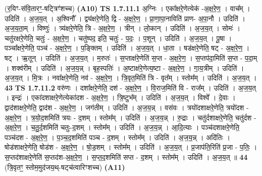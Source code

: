 \documentclass[17pt]{extarticle}
\begin{document}
                  \newline
                      (र॒यिꣳ-स॑वि॒तारꣳ॒॒-षट्त्रिꣳ॑शच्च)  \textbf{(A10)} \newline \newline
                                \textbf{ TS 1.7.11.1} \newline
                  अ॒ग्निः । एका᳚क्षरे॒णेत्येक॑ -अ॒क्ष॒रे॒ण॒ । वाच᳚म् । उदिति॑ । अ॒ज॒य॒त् । अ॒श्विनौ᳚ । द्व्य॑क्षरे॒णेति॒ द्वि - अ॒क्ष॒रे॒ण॒ । प्रा॒णा॒पा॒नाविति॑ प्राण- अ॒पा॒नौ । उदिति॑ । अ॒ज॒य॒ता॒म् । विष्णुः॑ । त्र्य॑क्षरे॒णेति॒ त्रि - अ॒क्ष॒रे॒ण॒ । त्रीन् । लो॒कान् । उदिति॑ । अ॒ज॒य॒त् । सोमः॑ । चतु॑रक्षरे॒णेति॒ चतुः॑ - अ॒क्ष॒रे॒ण॒ । चतु॑ष्पद॒ इति॒ चतुः॑ - प॒दः॒ । प॒शून् । उदिति॑ । अ॒ज॒य॒त् । पू॒षा । पञ्चा᳚क्षरे॒णेति॒ पञ्च॑ - अ॒क्ष॒रे॒ण॒ । प॒ङ्क्तिम् । उदिति॑ । अ॒ज॒य॒त् । धा॒ता । षड॑क्षरे॒णेति॒ षट् - अ॒क्ष॒रे॒ण॒ । षट् । ऋ॒तून् । उदिति॑ । अ॒ज॒य॒त् । म॒रुतः॑ । स॒प्ताक्ष॑रे॒णेति॑ स॒प्त - अ॒क्ष॒रे॒ण॒ । स॒प्तप॑दा॒मिति॑ स॒प्त - प॒दा॒म् । शक्व॑रीम् । उदिति॑ । अ॒ज॒य॒न्न् । बृह॒स्पतिः॑ । अ॒ष्टाक्ष॑रे॒णेत्य॒ष्टा - अ॒क्ष॒रे॒ण॒ । गा॒य॒त्रीम् । उदिति॑ । अ॒ज॒य॒त् । मि॒त्रः । नवा᳚क्षरे॒णेति॒ नव॑ - अ॒क्ष॒रे॒ण॒ । त्रि॒वृत॒मिति॑ त्रि - वृत᳚म् । स्तोम᳚म् । उदिति॑ । अ॒ज॒य॒त् । \textbf{  43} \newline
                  \newline
                                \textbf{ TS 1.7.11.2} \newline
                  वरु॑णः । दशा᳚क्षरे॒णेति॒ दश॑ - अ॒क्ष॒रे॒ण॒ । वि॒राज॒मिति॑ वि - राज᳚म् । उदिति॑ । अ॒ज॒य॒त् । इन्द्रः॑ । एका॑दशाक्षरे॒णेत्येका॑दश - अ॒क्ष॒रे॒ण॒ । त्रि॒ष्टुभ᳚म् । उदिति॑ । अ॒ज॒य॒त् । विश्वे᳚ । दे॒वाः । द्वाद॑शाक्षरे॒णेति॒ द्वाद॑श - अ॒क्ष॒रे॒ण॒ । जग॑तीम् । उदिति॑ । अ॒ज॒य॒न्न् । वस॑वः । त्रयो॑दशाक्षरे॒णेति॒ त्रयो॑दश - अ॒क्ष॒रे॒ण॒ । त्र॒यो॒द॒शमिति॑ त्रयः - द॒शम् । स्तोम᳚म् । उदिति॑ । अ॒ज॒य॒न्न् । रु॒द्राः । चतु॑र्दशाक्षरे॒णेति॒ चतु॑र्दश - अ॒क्ष॒रे॒ण॒ । च॒तु॒र्द॒शमिति॑ चतुः-द॒शम् । स्तोम᳚म् । उदिति॑ । अ॒ज॒य॒न्न् । आ॒दि॒त्याः । पञ्च॑दशाक्षरे॒णेति॒ पञ्च॑दश - अ॒क्ष॒रे॒ण॒ । प॒ञ्च॒द॒शमिति॑ पञ्च - द॒शम् । स्तोम᳚म् । उदिति॑ । अ॒ज॒य॒॒न्न् । अदि॑तिः । षोड॑शाक्षरे॒णेति॒ षोड॑श - अ॒क्ष॒रे॒ण॒ । षो॒ड॒शम् । स्तोम᳚म् । उदिति॑ । अ॒ज॒य॒त् । प्र॒जाप॑ति॒रिति॑ प्र॒जा - प॒तिः॒ । स॒प्तद॑शाक्षरे॒णेति॑ स॒प्तद॑श-अ॒क्ष॒रे॒ण॒ । स॒प्त॒द॒शमिति॑ सप्त - द॒शम् । स्तोम᳚म् । उदिति॑ । अ॒ज॒य॒त् ॥ \textbf{  44} \newline
                  \newline
                      (त्रि॒वृतꣳ॒॒ स्तोम॒मुद॑जय॒थ्-षट्च॑त्वारिꣳशच्च)  \textbf{(A11)} \newline \newline
\end{document}
